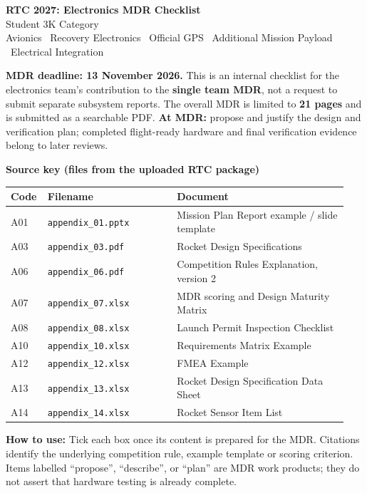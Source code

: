 \documentclass[10pt,a4paper]{article}
\begin{document}
\begin{center}
{\color{Navy}\LARGE\bfseries RTC 2027: Electronics MDR Checklist}\\[5pt]
{\large Student 3K Category}\\[5pt]
{\color{Muted}Avionics \textbullet\ Recovery Electronics \textbullet\ Official GPS \textbullet\ Additional Mission Payload \textbullet\ Electrical Integration}
\end{center}
\vspace{5pt}
\colorbox{VeryLight}{\parbox{\dimexpr\linewidth-2\fboxsep\relax}{%
\textbf{MDR deadline: 13 November 2026.} This is an internal checklist for the electronics team's contribution to the \textbf{single team MDR}, not a request to submit separate subsystem reports. The overall MDR is limited to \textbf{21 pages} and is submitted as a searchable PDF. \textbf{At MDR:} propose and justify the design and verification plan; completed flight-ready hardware and final verification evidence belong to later reviews.}}
\vspace{5pt}
\textbf{Source key (files from the uploaded RTC package)}
\begin{longtable}{@{}p{0.08\linewidth}p{0.37\linewidth}p{0.49\linewidth}@{}}
\toprule
\textbf{Code} & \textbf{Filename} & \textbf{Document}\\\midrule
A01 & \texttt{appendix\_01.pptx} & Mission Plan Report example / slide template\\
A03 & \texttt{appendix\_03.pdf} & Rocket Design Specifications\\
A06 & \texttt{appendix\_06.pdf} & Competition Rules Explanation, version 2\\
A07 & \texttt{appendix\_07.xlsx} & MDR scoring and Design Maturity Matrix\\
A08 & \texttt{appendix\_08.xlsx} & Launch Permit Inspection Checklist\\
A10 & \texttt{appendix\_10.xlsx} & Requirements Matrix Example\\
A12 & \texttt{appendix\_12.xlsx} & FMEA Example\\
A13 & \texttt{appendix\_13.xlsx} & Rocket Design Specification Data Sheet\\
A14 & \texttt{appendix\_14.xlsx} & Rocket Sensor Item List\\
\bottomrule
\end{longtable}
{\small\color{Muted}\textbf{How to use:} Tick each box once its content is prepared for the MDR. Citations identify the underlying competition rule, example template or scoring criterion. Items labelled ``propose'', ``describe'', or ``plan'' are MDR work products; they do not assert that hardware testing is already complete.}
\end{document}
